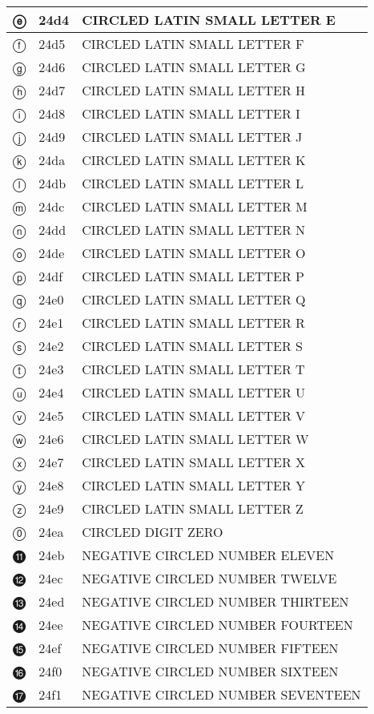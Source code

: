 \documentclass[12pt,letterpaper,openany]{book}
\begin{document}
\begin{center}
\begin{supertabular}{|m{0.25in}|m{0.5in}|m{4in}|}
ⓔ & 24d4 & CIRCLED LATIN SMALL LETTER E\\\hline
ⓕ & 24d5 & CIRCLED LATIN SMALL LETTER F\\\hline
ⓖ & 24d6 & CIRCLED LATIN SMALL LETTER G\\\hline
ⓗ & 24d7 & CIRCLED LATIN SMALL LETTER H\\\hline
ⓘ & 24d8 & CIRCLED LATIN SMALL LETTER I\\\hline
ⓙ & 24d9 & CIRCLED LATIN SMALL LETTER J\\\hline
ⓚ & 24da & CIRCLED LATIN SMALL LETTER K\\\hline
ⓛ & 24db & CIRCLED LATIN SMALL LETTER L\\\hline
ⓜ & 24dc & CIRCLED LATIN SMALL LETTER M\\\hline
ⓝ & 24dd & CIRCLED LATIN SMALL LETTER N\\\hline
ⓞ & 24de & CIRCLED LATIN SMALL LETTER O\\\hline
ⓟ & 24df & CIRCLED LATIN SMALL LETTER P\\\hline
ⓠ & 24e0 & CIRCLED LATIN SMALL LETTER Q\\\hline
ⓡ & 24e1 & CIRCLED LATIN SMALL LETTER R\\\hline
ⓢ & 24e2 & CIRCLED LATIN SMALL LETTER S\\\hline
ⓣ & 24e3 & CIRCLED LATIN SMALL LETTER T\\\hline
ⓤ & 24e4 & CIRCLED LATIN SMALL LETTER U\\\hline
ⓥ & 24e5 & CIRCLED LATIN SMALL LETTER V\\\hline
ⓦ & 24e6 & CIRCLED LATIN SMALL LETTER W\\\hline
ⓧ & 24e7 & CIRCLED LATIN SMALL LETTER X\\\hline
ⓨ & 24e8 & CIRCLED LATIN SMALL LETTER Y\\\hline
ⓩ & 24e9 & CIRCLED LATIN SMALL LETTER Z\\\hline
⓪ & 24ea & CIRCLED DIGIT ZERO\\\hline
⓫ & 24eb & NEGATIVE CIRCLED NUMBER ELEVEN\\\hline
⓬ & 24ec & NEGATIVE CIRCLED NUMBER TWELVE\\\hline
⓭ & 24ed & NEGATIVE CIRCLED NUMBER THIRTEEN\\\hline
⓮ & 24ee & NEGATIVE CIRCLED NUMBER FOURTEEN\\\hline
⓯ & 24ef & NEGATIVE CIRCLED NUMBER FIFTEEN\\\hline
⓰ & 24f0 & NEGATIVE CIRCLED NUMBER SIXTEEN\\\hline
⓱ & 24f1 & NEGATIVE CIRCLED NUMBER SEVENTEEN\\\hline

\end{supertabular}
\end{center}
\end{document}
